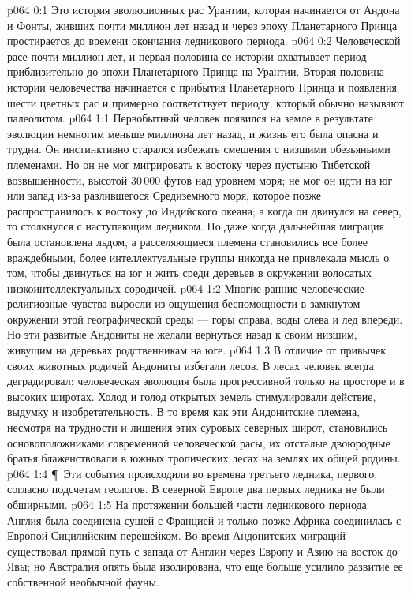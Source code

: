 \vs p064 0:1 Это история эволюционных рас Урантии, которая начинается от Андона и Фонты, живших почти миллион лет назад и через эпоху Планетарного Принца простирается до времени окончания ледникового периода.
\vs p064 0:2 Человеческой расе почти миллион лет, и первая половина ее истории охватывает период приблизительно до эпохи Планетарного Принца на Урантии. Вторая половина истории человечества начинается с прибытия Планетарного Принца и появления шести цветных рас и примерно соответствует периоду, который обычно называют палеолитом.
\vs p064 1:1 Первобытный человек появился на земле в результате эволюции немногим меньше миллиона лет назад, и жизнь его была опасна и трудна. Он инстинктивно старался избежать смешения с низшими обезьяньими племенами. Но он не мог мигрировать к востоку через пустыню Тибетской возвышенности, высотой 30\,000 футов над уровнем моря; не мог он идти на юг или запад из\hyp{}за разлившегося Средиземного моря, которое позже распространилось к востоку до Индийского океана; а когда он двинулся на север, то столкнулся с наступающим ледником. Но даже когда дальнейшая миграция была остановлена льдом, а расселяющиеся племена становились все более враждебными, более интеллектуальные группы никогда не привлекала мысль о том, чтобы двинуться на юг и жить среди деревьев в окружении волосатых низкоинтеллектуальных сородичей.
\vs p064 1:2 Многие ранние человеческие религиозные чувства выросли из ощущения беспомощности в замкнутом окружении этой географической среды --- горы справа, воды слева и лед впереди. Но эти развитые Андониты не желали вернуться назад к своим низшим, живущим на деревьях родственникам на юге.
\vs p064 1:3 В отличие от привычек своих животных родичей Андониты избегали лесов. В лесах человек всегда деградировал; человеческая эволюция была прогрессивной только на просторе и в высоких широтах. Холод и голод открытых земель стимулировали действие, выдумку и изобретательность. В то время как эти Андонитские племена, несмотря на трудности и лишения этих суровых северных широт, становились основоположниками современной человеческой расы, их отсталые двоюродные братья блаженствовали в южных тропических лесах на землях их общей родины.
\vs p064 1:4 \P\ Эти события происходили во времена третьего ледника, первого, согласно подсчетам геологов. В северной Европе два первых ледника не были обширными.
\vs p064 1:5 На протяжении большей части ледникового периода Англия была соединена сушей с Францией и только позже Африка соединилась с Европой Сицилийским перешейком. Во время Андонитских миграций существовал прямой путь с запада от Англии через Европу и Азию на восток до Явы; но Австралия опять была изолирована, что еще больше усилило развитие ее собственной необычной фауны.

